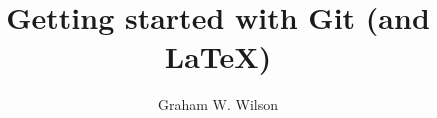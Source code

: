 \documentclass[12pt]{article}
\title{Getting started with Git (and \LaTeX)}
\author{Graham W. Wilson}
\begin{document}
\date{}
\maketitle



\end{document}
